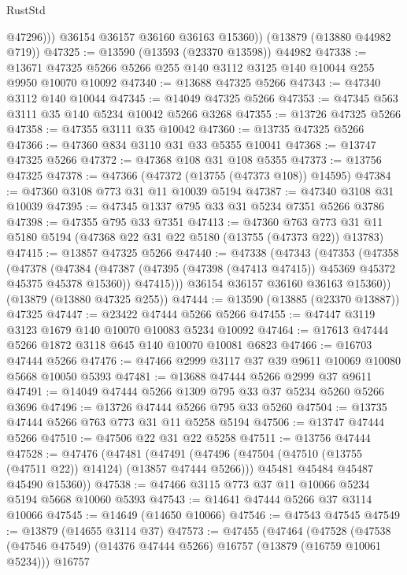 \begin{lexlean}{RustStd}
\begin{coremodule}
              @47296)))
        @36154
        @36157
        @36160
        @36163
        @15360))
    (@13879 (@13880 @44982 @719))
@47325 := @13590 (@13593 (@23370 @13598)) @44982
@47338 := @13671 @47325 @5266 @5266 @255 @140 @3112 @3125 @140 @10044 @255 @9950 @10070 @10092
@47340 := @13688 @47325 @5266
@47343 := @47340 @3112 @140 @10044
@47345 := @14049 @47325 @5266
@47353 := @47345 @563 @3111 @35 @140 @5234 @10042 @5266 @3268
@47355 := @13726 @47325 @5266
@47358 := @47355 @3111 @35 @10042
@47360 := @13735 @47325 @5266
@47366 := @47360 @834 @3110 @31 @33 @5355 @10041
@47368 := @13747 @47325 @5266
@47372 := @47368 @108 @31 @108 @5355
@47373 := @13756 @47325
@47378 := @47366 (@47372 (@13755 (@47373 @108)) @14595)
@47384 := @47360 @3108 @773 @31 @11 @10039 @5194
@47387 := @47340 @3108 @31 @10039
@47395 := @47345 @1337 @795 @33 @31 @5234 @7351 @5266 @3786
@47398 := @47355 @795 @33 @7351
@47413 := @47360
    @763
    @773
    @31
    @11
    @5180
    @5194
    (@47368 @22 @31 @22 @5180 (@13755 (@47373 @22)) @13783)
@47415 := @13857 @47325 @5266
@47440 := @47338
    (@47343
      (@47353
        (@47358
          (@47378
            (@47384
              (@47387 (@47395 (@47398 (@47413 @47415)) @45369 @45372 @45375 @45378 @15360))
              @47415)))
        @36154
        @36157
        @36160
        @36163
        @15360))
    (@13879 (@13880 @47325 @255))
@47444 := @13590 (@13885 (@23370 @13887)) @47325
@47447 := @23422 @47444 @5266 @5266
@47455 := @47447 @3119 @3123 @1679 @140 @10070 @10083 @5234 @10092
@47464 := @17613 @47444 @5266 @1872 @3118 @645 @140 @10070 @10081 @6823
@47466 := @16703 @47444 @5266
@47476 := @47466 @2999 @3117 @37 @39 @9611 @10069 @10080 @5668 @10050 @5393
@47481 := @13688 @47444 @5266 @2999 @37 @9611
@47491 := @14049 @47444 @5266 @1309 @795 @33 @37 @5234 @5260 @5266 @3696
@47496 := @13726 @47444 @5266 @795 @33 @5260
@47504 := @13735 @47444 @5266 @763 @773 @31 @11 @5258 @5194
@47506 := @13747 @47444 @5266
@47510 := @47506 @22 @31 @22 @5258
@47511 := @13756 @47444
@47528 := @47476
    (@47481
      (@47491
        (@47496 (@47504 (@47510 (@13755 (@47511 @22)) @14124) (@13857 @47444 @5266)))
        @45481
        @45484
        @45487
        @45490
        @15360))
@47538 := @47466 @3115 @773 @37 @11 @10066 @5234 @5194 @5668 @10060 @5393
@47543 := @14641 @47444 @5266 @37 @3114 @10066
@47545 := @14649 (@14650 @10066)
@47546 := @47543 @47545
@47549 := @13879 (@14655 @3114 @37)
@47573 := @47455
    (@47464
      (@47528
        (@47538 (@47546 @47549) (@14376 @47444 @5266) @16757 (@13879 (@16759 @10061 @5234)))
        @16757

\end{coremodule}
\end{lexlean}
